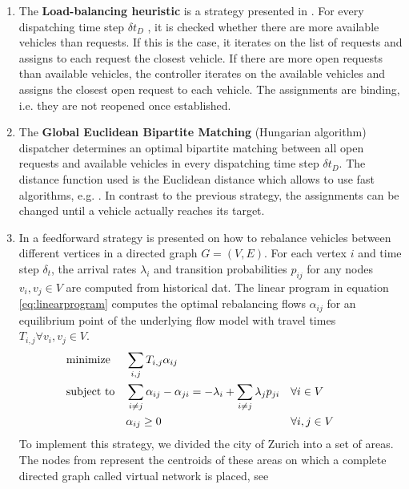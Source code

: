 \begin{enumerate}
\item The \textbf{Load-balancing heuristic} is a strategy presented in \cite{bischoff2016simulation}.
For every dispatching time step $\delta t_D$ , it is checked whether there are more available vehicles than requests.
If this is the case, it iterates on the list of requests and assigns to each request the closest vehicle. If there are more open
requests than available vehicles, the controller iterates on the available vehicles and assigns the closest open request to each vehicle.
The assignments are binding, i.e. they are not reopened once established.
\item The \textbf{Global Euclidean Bipartite Matching} (Hungarian algorithm) dispatcher determines an optimal bipartite
matching between all open requests and available vehicles in every dispatching time step
$\delta t_D$. The distance function used is the Euclidean distance which allows to use fast
algorithms, e.g. \cite{agarwal2004near}. In contrast to the previous strategy, the
assignments can be changed until a vehicle actually reaches its target.
\item In \cite{pavone2011load} a feedforward strategy is presented on how to rebalance vehicles between different vertices
in a directed graph $G = (V,E)$. For each vertex $i$ and time step $\delta_t$, the arrival rates $\lambda_i$ and transition probabilities $p_{ij}$ for
any nodes $v_i, v_j \in V$  are computed from historical dat. The linear program in equation \ref{eq:linearprogram}
computes the optimal rebalancing flows $\alpha _{ij}$ for an equilibrium point of the underlying flow
model with travel times $T_{i,j} \forall v_i, v_j \in V$.
\begin{align}
&\textnormal{minimize}& &\sum_{i,j} T_{i,j} \alpha _{ij} & && && \nonumber \\
&\textnormal{subject to}&
&\sum_{i \neq j} \alpha _{ij} - \alpha _{ji} =-\lambda_i  + \sum_{i \neq j} \lambda_j p_{ji}
& &\forall i \in V &\label{eq:linearprogram} \\
&& &\alpha_{ij} \geq 0& & \forall i, j \in V& \nonumber
\end{align}
To implement this strategy, we divided the city of Zurich into a set of areas.
The nodes from \cite{pavone2011load} represent the centroids of these areas on
which a complete directed graph called virtual network is placed, see

\end{enumerate}
